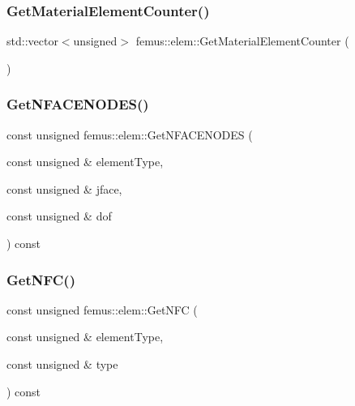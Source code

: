 \subsubsection{\texorpdfstring{Get\+Material\+Element\+Counter()}{GetMaterialElementCounter()}}
{\footnotesize\ttfamily std\+::vector$<$unsigned$>$ femus\+::elem\+::\+Get\+Material\+Element\+Counter (\begin{DoxyParamCaption}{ }\end{DoxyParamCaption})\hspace{0.3cm}{\ttfamily [inline]}}

\mbox{\label{classfemus_1_1elem_add93a6ef1b8c8c3ca75b77c5ba9b5c01}} 
\subsubsection{\texorpdfstring{Get\+N\+F\+A\+C\+E\+N\+O\+D\+E\+S()}{GetNFACENODES()}}
{\footnotesize\ttfamily const unsigned femus\+::elem\+::\+Get\+N\+F\+A\+C\+E\+N\+O\+D\+ES (\begin{DoxyParamCaption}\item[{const unsigned \&}]{element\+Type,  }\item[{const unsigned \&}]{jface,  }\item[{const unsigned \&}]{dof }\end{DoxyParamCaption}) const}

\mbox{\label{classfemus_1_1elem_a01b20b2ba99d7a59ea3620a0e689e9f3}} 
\subsubsection{\texorpdfstring{Get\+N\+F\+C()}{GetNFC()}}
{\footnotesize\ttfamily const unsigned femus\+::elem\+::\+Get\+N\+FC (\begin{DoxyParamCaption}\item[{const unsigned \&}]{element\+Type,  }\item[{const unsigned \&}]{type }\end{DoxyParamCaption}) const}

\mbox{\label{classfemus_1_1elem_a0b2541b53f5fb43859419d51e8e8fbb7}} 
